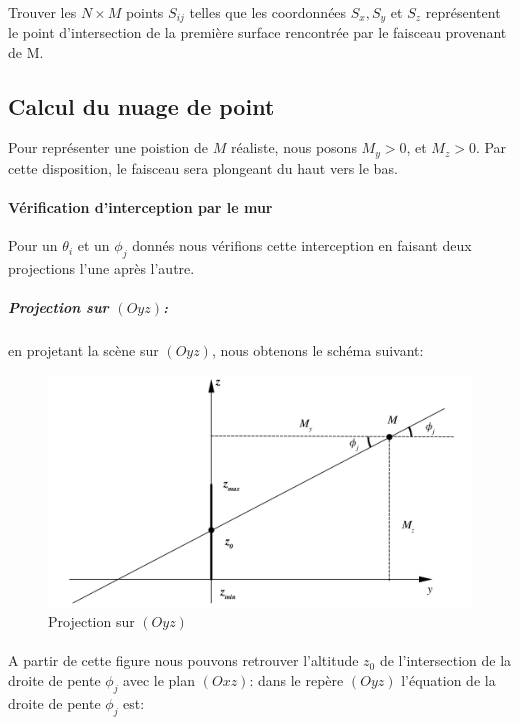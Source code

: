\documentclass[12pt,a4paper]{report}
\begin{document}
\paragraph{}
Trouver les $N \times M$ points $S_{ij}$ telles que les coordonnées $S_x, S_y$ et $S_z$ représentent le point d'intersection de la première surface rencontrée par le faisceau provenant de M.


\subsection{Calcul du nuage de point}
Pour représenter une poistion de $M$ réaliste, nous posons $M_y > 0 $, et $M_z > 0$. Par cette disposition, le faisceau sera plongeant du haut vers le bas. 

\paragraph{Vérification d'interception par le mur} Pour un $\theta_i$ et un $\phi_j$ donnés nous vérifions cette interception en faisant deux projections l'une après l'autre.

\subparagraph{Projection sur $(Oyz)$:} en projetant la scène sur $(Oyz)$, nous obtenons le schéma suivant:

\begin{figure}[H]
	\centering
	\includegraphics[width=0.8\linewidth]{img/ProjOyzZ0}
	\caption{Projection sur $(Oyz)$}
	\label{fig:projoyzz0}
\end{figure}

\paragraph{} A partir de cette figure nous pouvons retrouver l'altitude $z_0$ de l'intersection de la droite de pente $\phi_j$ avec le plan $(Oxz)$: dans le repère $(Oyz)$ l'équation de la droite de pente $\phi_j$ est:
\end{document}
